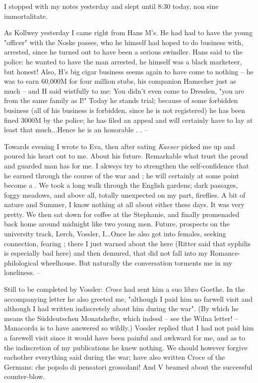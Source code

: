 
I stopped with my notes yesterday and slept until 8:30 today, non sine immortalitate.

As Kollwey  yesterday I came right from Hans M's. He had had to have the young "officer" with the Noske passes, who he himself had hoped to do business with, arrested, since he turned out to have been  a serious swindler. Hans said to the police: he wanted to have the man arrested, he himself was a black marketeer, but honest! Also, H's big cigar business seems again to have come to nothing -- he was to earn 60,000M for four million stubs, his companion Hamecher just as much -- and H said wistfully to me: You didn't even come to Dresden, "you are from the same family as I!" Today he stands trial; because of some forbidden business (all of his business is forbidden, since he is not registered) he has been fined 3000M by the police; he has filed an appeal and will certainly have to lay at least that much...Hence he is an honorable . . --

Towards evening I wrote to Eva, then after eating \textit{Kaeser} picked me up and poured his heart out to me. About his future. Remarkable what trust the proud and guarded man has for me. I akwsys try to strengthen the self-confidence that he earned through the course of the war and ; he will certainly at some point become a . We took a long walk through the English gardens; dark passages, foggy meadows, and above all, totally unexpected on my part, fireflies. A bit of nature and Summer, I know nothing at all about either these days. It was very pretty. We then sat down for coffee at the Stephanie, and finally promenaded back home around midnight like two young men. Future, prospects on the university track, Lerch, Vossler, I...Once he also got into females, seeking connection, fearing ; there I just warned about the  here (Ritter said that syphilis is especially bad here) and then demured, that did not fall into my Romance-philological wheelhouse. But naturally the conversation torments me in my loneliness. --

Still to be completed by Vossler: \textit{Croce} had sent him a suo libro Goethe. In the accompanying letter he also greeted me, "although I paid him no farwell visit and although I had written indiscretely about him during the war". (By which he means the Süddeutschen Monatshefte, which indeed -- see the Wilna letter! -- Manacorda is to have answered so wildly.) Vossler replied that I had not paid him a farewell visit since it would have been painful and awkward for me, and as to the indiscretion of my publications he knew nothing. We should however forgive eachother everything said during the war; have also written Croce of the Germans: che popolo di pensatori grossolani! And V beamed about the successful counter-blow.

